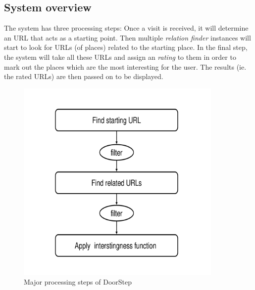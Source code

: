 \documentclass[a4paper]{danarticle}
\begin{document}
    \subsection{System overview}
      The system has three processing steps: Once a visit is received,
      it will determine an URL that acts as a starting point.
      Then multiple \textit{relation finder} instances will start to
      look for URLs (of places) related to the starting place. In
      the final step, the system will take all these URLs and assign an
      \textit{rating} to them in order to mark out the places
      which are the most interesting for the user. The results (ie. the
      rated URLs) are then passed on to be displayed.
      \begin{figure}[h]
        \centering
	\includegraphics[width=10cm]{steps_overview}
	\caption{Major processing steps of DoorStep}
	\label{steps_overview}
      \end{figure}
\end{document}
